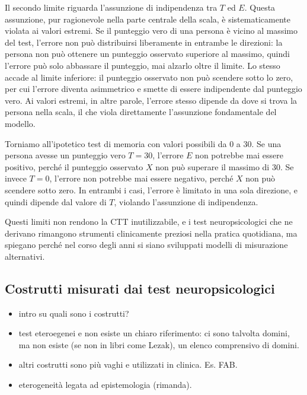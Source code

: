 \documentclass[
  italian,
  letterpaper,
  paper=6in:9in,
  pagesize=pdftex,
  headinclude=on,
  footinclude=on,
  11pt]{scrbook}
\providecommand{\tightlist}{%
  \setlength{\itemsep}{0pt}\setlength{\parskip}{0pt}}
\begin{document}
Il secondo limite riguarda l'assunzione di indipendenza tra \(T\) ed
\(E\). Questa assunzione, pur ragionevole nella parte centrale della
scala, è sistematicamente violata ai valori estremi. Se il punteggio
vero di una persona è vicino al massimo del test, l'errore non può
distribuirsi liberamente in entrambe le direzioni: la persona non può
ottenere un punteggio osservato superiore al massimo, quindi l'errore
può solo abbassare il punteggio, mai alzarlo oltre il limite. Lo stesso
accade al limite inferiore: il punteggio osservato non può scendere
sotto lo zero, per cui l'errore diventa asimmetrico e smette di essere
indipendente dal punteggio vero. Ai valori estremi, in altre parole,
l'errore stesso dipende da dove si trova la persona nella scala, il che
viola direttamente l'assunzione fondamentale del modello.

Torniamo all'ipotetico test di memoria con valori possibili da 0 a 30.
Se una persona avesse un punteggio vero \(T=30\), l'errore \(E\) non
potrebbe mai essere positivo, perché il punteggio osservato \(X\) non
può superare il massimo di 30. Se invece \(T=0\), l'errore non potrebbe
mai essere negativo, perché \(X\) non può scendere sotto zero. In
entrambi i casi, l'errore è limitato in una sola direzione, e quindi
dipende dal valore di \(T\), violando l'assunzione di indipendenza.

Questi limiti non rendono la CTT inutilizzabile, e i test
neuropsicologici che ne derivano rimangono strumenti clinicamente
preziosi nella pratica quotidiana, ma spiegano perché nel corso degli
anni si siano sviluppati modelli di misurazione alternativi.

\subsection{Costrutti misurati dai test
neuropsicologici}\label{costrutti-misurati-dai-test-neuropsicologici}

\begin{itemize}
\tightlist
\item
  intro su quali sono i costrutti?
\item
  test eteroegenei e non esiste un chiaro riferimento: ci sono talvolta
  domini, ma non esiste (se non in libri come Lezak), un elenco
  comprensivo di domini.
\item
  altri costrutti sono più vaghi e utilizzati in clinica. Es. FAB.
\item
  eterogeneità legata ad epistemologia (rimanda).
\end{itemize}
\end{document}

